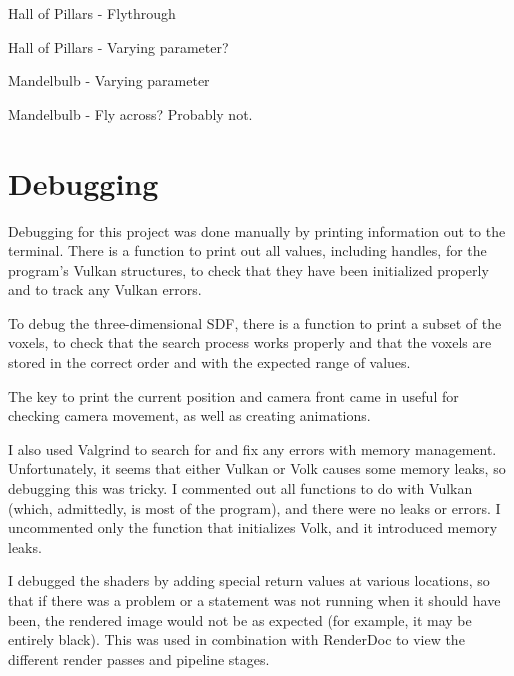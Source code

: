 Hall of Pillars - Flythrough

Hall of Pillars - Varying parameter?

Mandelbulb - Varying parameter

Mandelbulb - Fly across? Probably not.

\section{Debugging}

Debugging for this project was done manually by printing information out to the terminal. There is a function to print out all values, including handles, for the program's Vulkan structures, to check that they have been initialized properly and to track any Vulkan errors.\newline

To debug the three-dimensional SDF, there is a function to print a subset of the voxels, to check that the search process works properly and that the voxels are stored in the correct order and with the expected range of values.\newline

The key to print the current position and camera front came in useful for checking camera movement, as well as creating animations.\newline

I also used Valgrind to search for and fix any errors with memory management. Unfortunately, it seems that either Vulkan or Volk causes some memory leaks, so debugging this was tricky. I commented out all functions to do with Vulkan (which, admittedly, is most of the program), and there were no leaks or errors. I uncommented only the function that initializes Volk, and it introduced memory leaks.\newline

I debugged the shaders by adding special return values at various locations, so that if there was a problem or a statement was not running when it should have been, the rendered image would not be as expected (for example, it may be entirely black). This was used in combination with RenderDoc to view the different render passes and pipeline stages.